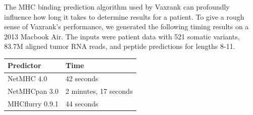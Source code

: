 \documentclass[10pt,letterpaper]{article}
\begin{document}
The MHC binding prediction algorithm used by Vaxrank can profoundly influence how long it takes to determine results for a patient. To give a rough sense of Vaxrank's performance, we generated the following timing results on a 2013 Macbook Air. The inputs were patient data with 521 somatic variants, 83.7M aligned tumor RNA reads, and peptide predictions for lengths 8-11. 
\begin{center}
\begin{tabular}{ | l | l | }
	\hline
	Predictor & Time \\ \hline
	NetMHC 4.0 & 42 seconds\\
	NetMHCpan 3.0 & 2 minutes, 17 seconds \\
	MHCflurry 0.9.1 & 44 seconds \\ \hline
\end{tabular} 

\end{center}
\end{document}
